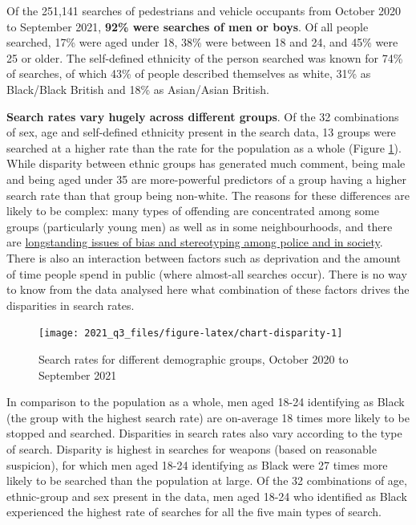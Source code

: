 \documentclass[
  a4paper,
  twoside, 11pt]{article}
\begin{document}
Of the 251,141 searches of pedestrians and vehicle occupants from October 2020 to September 2021, \textbf{92\% were searches of men or boys}. Of all people searched, 17\% were aged under 18, 38\% were between 18 and 24, and 45\% were 25 or older. The self-defined ethnicity of the person searched was known for 74\% of searches, of which 43\% of people described themselves as white, 31\% as Black/Black British and 18\% as Asian/Asian British.

\textbf{Search rates vary hugely across different groups}. Of the 32 combinations of sex, age and self-defined ethnicity present in the search data, 13 groups were searched at a higher rate than the rate for the population as a whole (Figure \ref{fig:chart-disparity}). While disparity between ethnic groups has generated much comment, being male and being aged under 35 are more-powerful predictors of a group having a higher search rate than that group being non-white. The reasons for these differences are likely to be complex: many types of offending are concentrated among some groups (particularly young men) as well as in some neighbourhoods, and there are \href{https://www.bbc.co.uk/news/uk-47300343}{longstanding issues of bias and stereotyping among police and in society}. There is also an interaction between factors such as deprivation and the amount of time people spend in public (where almost-all searches occur). There is no way to know from the data analysed here what combination of these factors drives the disparities in search rates.



\begin{figure}[tb]

{\centering \texttt{[image: 2021\_q3\_files/figure-latex/chart-disparity-1]} 

}

\caption{Search rates for different demographic groups, October 2020 to September 2021}\label{fig:chart-disparity}
\end{figure}

In comparison to the population as a whole, men aged 18-24 identifying as Black (the group with the highest search rate) are on-average 18 times more likely to be stopped and searched. Disparities in search rates also vary according to the type of search. Disparity is highest in searches for weapons (based on reasonable suspicion), for which men aged 18-24 identifying as Black were 27 times more likely to be searched than the population at large. Of the 32 combinations of age, ethnic-group and sex present in the data, men aged 18-24 who identified as Black experienced the highest rate of searches for all the five main types of search.
\end{document}

